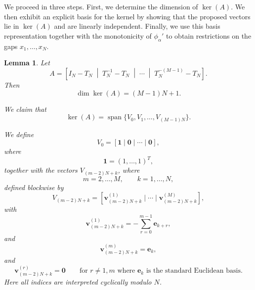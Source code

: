 \documentclass{article}
\newtheorem{lemma}[theorem]{Lemma}
\begin{document}
We proceed in three steps. First, we determine the dimension of $\ker(A)$. We then exhibit an explicit basis for the kernel by showing that the proposed vectors lie in $\ker(A)$ and are linearly independent. Finally, we use this basis representation together with the monotonicity of $\phi_\alpha'$ to obtain restrictions on the gaps $x_1,\dots,x_N$.


\begin{lemma}
Let
\[A=\left[I_N-T_N\;\middle|\;T_N^{-1}-T_N\;\middle|\;\cdots\;\middle|\;T_N^{-(M-1)}-T_N\right]. \]
Then
\begin{equation}\label{n odd dim}
    \dim\ker(A)=(M-1)N+1.
\end{equation}

We claim that
\begin{equation}\label{N odd span vectors}
   \ker(A)
=
\operatorname{span}\{V_0,V_1,\dots,V_{(M-1)N}\}. 
\end{equation}

We define
\[
V_0=
[\mathbf{1}\mid\mathbf{0}\mid\cdots\mid\mathbf{0}],
\]
where
\[
\mathbf{1}=(1,\dots,1)^T,
\]
together with the vectors $V_{(m-2)N+k}$, where
\[
m=2,\dots,M,
\qquad
k=1,\dots,N,
\]
defined blockwise by
\[
V_{(m-2)N+k}
=
[\mathbf{v}_{(m-2)N+k}^{(1)}\mid\cdots\mid \mathbf{v}_{(m-2)N+k}^{(M)}],
\]
with
\[
\mathbf{v}_{(m-2)N+k}^{(1)}
=
-\sum_{r=0}^{m-1}\mathbf{e}_{k+r},\]
and 
\[\mathbf{v}_{(m-2)N+k}^{(m)}=\mathbf{e}_k,
\]
and
\[
\mathbf{v}_{(m-2)N+k}^{(r)}=\mathbf{0}
\qquad
\text{for }r\neq 1,m \text{ where } \mathbf{e}_k \text{ is the standard Euclidean basis.}
\]
Here all indices are interpreted cyclically modulo $N$.

   
   

\end{lemma}
\end{document}
